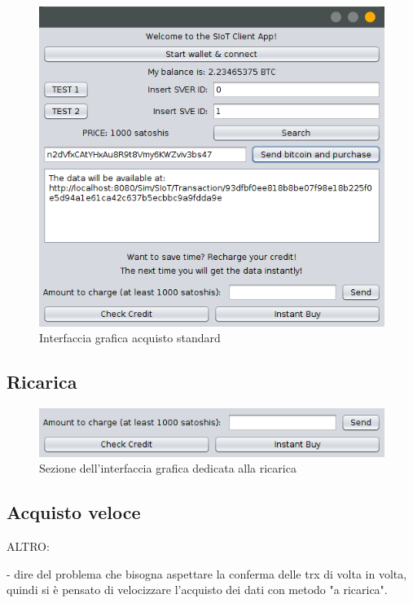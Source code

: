 \begin{figure}[h!t]
\centerline{\includegraphics[width=\textwidth]{img/gui-final-client}}
\caption{Interfaccia grafica acquisto standard}
\label{f:integr:gui-final-client}
\end{figure}

\subsection{Ricarica}

\begin{figure}[h!t]
\centerline{\includegraphics[width=\textwidth]{img/gui-recharge}}
\caption{Sezione dell'interfaccia grafica dedicata alla ricarica}
\label{f:integr:gui-recharge}
\end{figure}

\subsection{Acquisto veloce}


ALTRO:

- dire del problema che bisogna aspettare la conferma delle trx di volta in volta, quindi si è pensato di velocizzare l'acquisto dei dati con metodo "a ricarica".

